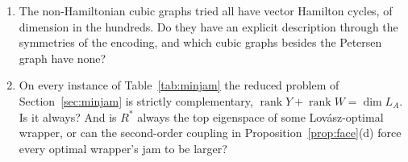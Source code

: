 \documentclass[11pt]{article}
\theoremstyle{definition}
\theoremstyle{remark}
\DeclareMathOperator{\rank}{rank}
\begin{document}
\begin{enumerate}
rule that subsumes contradiction analysis. How much does it add on the
instances of Section~\ref{sec:sat01comp}, and does iterating it refute
32713?
\item The non-Hamiltonian cubic graphs tried all have vector Hamilton cycles,
of dimension in the hundreds. Do they have an explicit description through the
symmetries of the encoding, and which cubic graphs besides the Petersen graph
have none?
\item On every instance of Table~\ref{tab:minjam} the reduced problem of
Section~\ref{sec:minjam} is strictly complementary, $\rank Y+\rank W=\dim
L_A$. Is it always? And is $R^*$ always the top eigenspace of some
Lov\'asz-optimal wrapper, or can the second-order coupling in
Proposition~\ref{prop:face}(d) force every optimal wrapper's jam to be
larger?
\end{enumerate}
\end{document}
